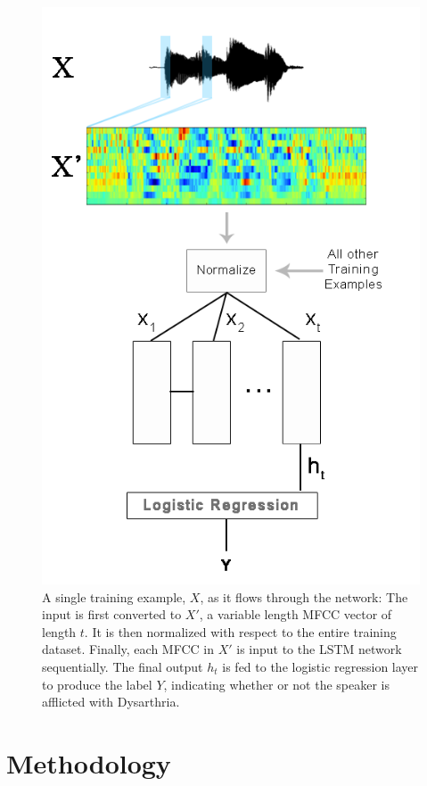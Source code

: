 \documentclass[conference]{IEEEtran}
\begin{document}
\begin{figure}[t]
\centering
\includegraphics[width=\columnwidth]{architecture}
\caption{A single training example, $X$, as it flows through the network: The input is first converted to $X'$, a variable length MFCC vector of length $t$. It is then normalized with respect to the entire training dataset. Finally, each MFCC in $X'$ is input to the LSTM network sequentially. The final output $h_t$ is fed to the logistic regression layer to produce the label $Y$, indicating whether or not the speaker is afflicted with Dysarthria.}
\label{fig-architecture}
\end{figure}

\section{Methodology}
\end{document}
